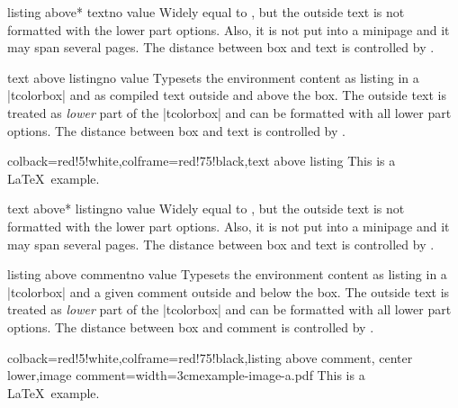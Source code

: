 \begin{docTcbKey}[][doc new=2014-11-07]{listing above* text}{}{no value}
  Widely equal to , but the outside text is
  not formatted with the lower part options.
  Also, it is not put into a minipage and it may span several pages.
  The distance between box and text is controlled by .
\end{docTcbKey}

\clearpage

\begin{docTcbKey}{text above listing}{}{no value}
  Typesets the environment content as listing in a |tcolorbox|
  and as compiled text outside and above the box.
  The outside text is treated as \emph{lower} part of the
  |tcolorbox| and can be formatted with all lower part options.
  The distance between box and text is controlled by .
\begin{dispExample}
\begin{tcblisting}{colback=red!5!white,colframe=red!75!black,text above listing}
This is a \LaTeX\ example.
\end{tcblisting}
\end{dispExample}
\end{docTcbKey}


\begin{docTcbKey}[][doc new=2014-11-07]{text above* listing}{}{no value}
  Widely equal to , but the outside text is
  not formatted with the lower part options.
  Also, it is not put into a minipage and it may span several pages.
  The distance between box and text is controlled by .
\end{docTcbKey}



\begin{docTcbKey}{listing above comment}{}{no value}
  Typesets the environment content as listing in a |tcolorbox|
  and a given comment outside and below the box.
  The outside text is treated as \emph{lower} part of the
  |tcolorbox| and can be formatted with all lower part options.
  The distance between box and comment is controlled by .
\begin{dispExample}
\begin{tcblisting}{colback=red!5!white,colframe=red!75!black,listing above comment,
  center lower,image comment={width=3cm}{example-image-a.pdf}}
This is a \LaTeX\ example.
\end{tcblisting}
\end{dispExample}
\end{docTcbKey}


